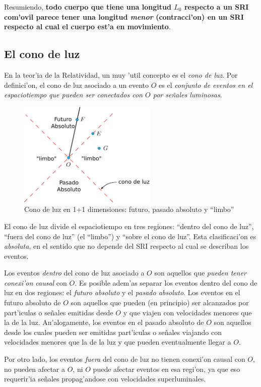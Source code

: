 Resumiendo, \textbf{todo cuerpo que tiene una longitud $L_0$ respecto a un SRI com'ovil parece tener una longitud \textit{menor} (contracci'on) en un SRI respecto al cual el cuerpo est'a en movimiento}.

\subsection{El cono de luz}
En la teor'ia de la Relatividad, un muy 'util concepto es el \textit{cono de luz}. Por definici'on, el cono de luz asociado a un evento $O$ es el \textit{conjunto de eventos en el espaciotiempo que pueden ser conectados con $O$ por se\~nales luminosas}.
\begin{figure}[!h]
\centerline{\includegraphics[height= 5cm]{fig/fig-cono-de-luz-1D.pdf}}
 \caption{Cono de luz en 1+1 dimensiones: futuro, pasado absoluto y ``limbo''}
\label{lc}
\end{figure}
El cono de luz divide el espaciotiempo en tres regiones: ``dentro del cono de luz'', ``fuera del cono de luz'' (el ``limbo'') y ``sobre el cono de luz''. Esta clasificaci'on es \textit{absoluta}, en el sentido que no depende del SRI respecto al cual se describan los eventos.

Los eventos \textit{dentro} del cono de luz asociado a $O$ son aquellos que \textit{pueden tener conexi'on causal} con $O$. Es posible adem'as separar los eventos dentro del cono de luz en dos regiones: el \textit{futuro absoluto} y el \textit{pasado absoluto}. Los eventos en el futuro absoluto de $O$ son aquellos que pueden (en principio) ser alcanzados por part'iculas o se\~nales emitidas desde  $O$  y que viajen con velocidades menores que la de la luz. An'alogamente, los eventos en el pasado absoluto de $O$ son aquellos desde los cuales pueden ser emitidas part'iculas o se\~nales viajando con velocidades menores que la de la luz y que pueden eventualmente llegar a $O$. 

Por otro lado, los eventos \textit{fuera} del cono de luz no tienen conexi'on causal con $O$, no pueden afectar a $O$, ni $O$ puede afectar eventos en esa regi'on, ya que eso requerir'ia se\~nales propag'andose con velocidades superluminales.

